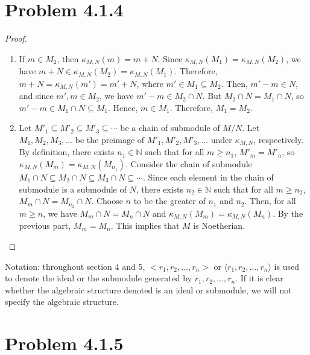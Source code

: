 \documentclass[12pt]{article}
\newcommand{\N}{\mathbb{N}}
\begin{document}
\section{Problem 4.1.4}

\begin{proof}
\begin{enumerate}
    \item If $m \in M_2$, then $\kappa_{M,N}(m) = m + N$. Since $\kappa_{M,N}(M_1) = \kappa_{M,N}(M_2)$, we have $m + N \in \kappa_{M,N}(M_2) = \kappa_{M,N}(M_1)$. Therefore, $m + N = \kappa_{M,N}(m') = m' + N$, where $m' \in M_1 \subseteq M_2$. Then, $m'-m \in N$, and since $m', m \in M_2$, we have $m'-m \in M_2 \cap N$. But $M_2 \cap N = M_1 \cap N$, so $m'-m \in M_1 \cap N \subseteq M_1$. Hence, $m\in M_1$. Therefore, $M_1 = M_2$.
    \item Let $M'_1 \subseteq M'_2 \subseteq M'_3 \subseteq \cdots$ be a chain of submodule of $M/N$. Let $M_1, M_2, M_3, \ldots$ be the preimage of $M'_1, M'_2, M'_3, \ldots$ under $\kappa_{M,N}$, respectively. By definition, there exists $n_1 \in \N$ such that for all $m \geq n_1$, $M'_m = M'_n$, so $\kappa_{M,N}(M_m) = \kappa_{M,N}(M_{n_1})$. Consider the chain of submodule $M_1 \cap N \subseteq M_2 \cap N \subseteq M_3 \cap N \subseteq \cdots$. Since each element in the chain of submodule is a submodule of $N$, there exists $n_2 \in \N$ such that for all $m \geq n_2$, $M_m \cap N = M_{n_2} \cap N$. Choose $n$ to be the greater of $n_1$ and $n_2$. Then, for all $m \geq n$, we have $M_m \cap N = M_n \cap N$ and $\kappa_{M,N}(M_m) = \kappa_{M,N}(M_n)$. By the previous part, $M_m=M_n$. This implies that $M$ is Noetherian.
\end{enumerate}
\end{proof}
Notation: throughout section $4$ and $5$, $<r_1, r_2, \ldots, r_n>$ or $\langle r_1, r_2, \ldots, r_n \rangle$ is used to denote the ideal or the submodule generated by $r_1, r_2, \ldots, r_n$. If it is clear whether the algebraic structure denoted is an ideal or submodule, we will not specify the algebraic structure.
\newpage 

\section{Problem 4.1.5}
\end{document}
